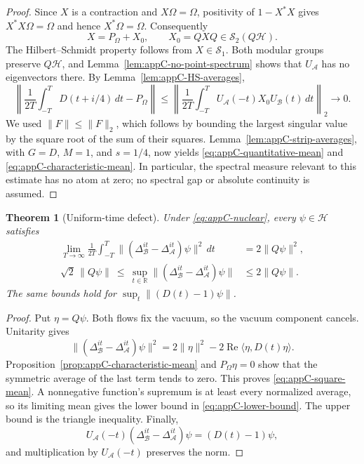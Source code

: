 \documentclass[a4paper,11pt]{article}
\newtheorem{theorem}{Theorem}
\theoremstyle{definition}
\begin{document}
\begin{proof}
Since $X$ is a contraction and $X\Omega=\Omega$, positivity of $1-X^*X$ gives $X^*X\Omega=\Omega$ and hence $X^*\Omega=\Omega$. Consequently
\begin{equation}
 X=P_\Omega+X_0,\qquad X_0=QXQ\in\mathcal S_2(Q\mathcal H).
 \label{eq:appC-vacuum-split}
\end{equation}
The Hilbert--Schmidt property follows from $X\in\mathcal S_1$. Both modular groups preserve $Q\mathcal H$, and Lemma~\ref{lem:appC-no-point-spectrum} shows that $U_{\mathcal A}$ has no eigenvectors there. By Lemma~\ref{lem:appC-HS-averages},
\[
 \left\|\frac1{2T}\int_{-T}^{T}D(t+i/4)\,dt-P_\Omega\right\|
 \le
 \left\|\frac1{2T}\int_{-T}^{T}
 U_{\mathcal A}(-t)X_0U_{\mathcal B}(t)\,dt\right\|_2
 \longrightarrow0 .
\]
We used $\|F\|\le\|F\|_2$, which follows by bounding the largest singular value by the square root of the sum of their squares. Lemma~\ref{lem:appC-strip-averages}, with $G=D$, $M=1$, and $s=1/4$, now yields \eqref{eq:appC-quantitative-mean} and \eqref{eq:appC-characteristic-mean}. In particular, the spectral measure relevant to this estimate has no atom at zero; no spectral gap or absolute continuity is assumed.
\end{proof}

\begin{theorem}[Uniform-time defect]\label{thm:appC-uniform-defect}
Under \eqref{eq:appC-nuclear}, every $\psi\in\mathcal H$ satisfies
\begin{align}
 \lim_{T\to\infty}\frac1{2T}\int_{-T}^{T}
 \|(\Delta_{\mathcal B}^{it}-\Delta_{\mathcal A}^{it})\psi\|^2\,dt
 &=2\|Q\psi\|^2, \label{eq:appC-square-mean}\\
 \sqrt{2}\,\|Q\psi\|
 \ \le\ \sup_{t\in\mathbb R}
 \|(\Delta_{\mathcal B}^{it}-\Delta_{\mathcal A}^{it})\psi\|
 &\le 2\|Q\psi\| .
 \label{eq:appC-lower-bound}
\end{align}
The same bounds hold for $\sup_t\|(D(t)-1)\psi\|$.
\end{theorem}

\begin{proof}
Put $\eta=Q\psi$. Both flows fix the vacuum, so the vacuum component cancels. Unitarity gives
\begin{equation}
 \|(\Delta_{\mathcal B}^{it}-\Delta_{\mathcal A}^{it})\psi\|^2
 =2\|\eta\|^2-2\operatorname{Re}\langle\eta,D(t)\eta\rangle .
 \label{eq:appC-defect-identity}
\end{equation}
Proposition~\ref{prop:appC-characteristic-mean} and $P_\Omega\eta=0$ show that the symmetric average of the last term tends to zero. This proves \eqref{eq:appC-square-mean}. A nonnegative function's supremum is at least every normalized average, so its limiting mean gives the lower bound in \eqref{eq:appC-lower-bound}. The upper bound is the triangle inequality. Finally,
\[
 U_{\mathcal A}(-t)
 (\Delta_{\mathcal B}^{it}-\Delta_{\mathcal A}^{it})\psi
 =(D(t)-1)\psi ,
\]
and multiplication by $U_{\mathcal A}(-t)$ preserves the norm.
\end{proof}
\end{document}
